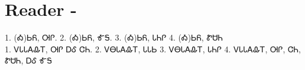 \section{Reader -}
1. (Ꭳ)ᏏᏲ, ᎺᎵ. 2. (Ꭳ)ᏏᏲ, ᎹᎦ. 3. (Ꭳ)ᏏᏲ, ᏓᏂᎵ 4. (Ꭳ)ᏏᏲ, ᏑᏌᏂ 
\\
1. ᏙᏓᏓᎪᎲᎢ, ᎺᎵ ᎠᎴ ᏣᏂ. 2. ᏙᎾᏓᎪᎲᎢ, ᏓᏓᏏ 3. ᏙᎾᏓᎪᎲᎢ, ᏓᏂᎵ 4. ᏙᏓᏓᎪᎲᎢ, ᎺᎵ, ᏣᏂ, ᏑᏌᏂ, ᎠᎴ ᎹᎦ 
\\
